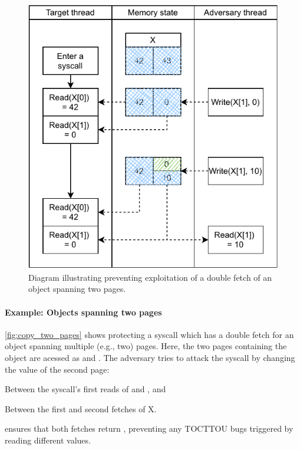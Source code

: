 \documentclass[letterpaper,twocolumn,10pt]{article}
\begin{document}
\begin{figure}[]
  \includegraphics[width=\linewidth]{img/copy_two_pages.pdf}
  \caption{Diagram illustrating \tiktok preventing exploitation 
  of a double fetch of an object  spanning two pages.}
  \label{fig:copy_two_pages}
\end{figure}

\paragraph{Example: Objects spanning two pages}
\autoref{fig:copy_two_pages} shows \tiktok protecting a syscall which
has a double fetch for an object spanning multiple (e.g., two) pages.
Here, the two pages containing the object  are acessed as 
 and . 
The adversary tries to attack the syscall by changing the value of the 
second page:
\begin{inparaenum}
\item Between the syscall's first reads of  and , and
\item Between the first and second fetches of X.
\end{inparaenum}
\tiktok ensures that both fetches return , preventing any 
TOCTTOU bugs triggered by reading different values.
\end{document}
